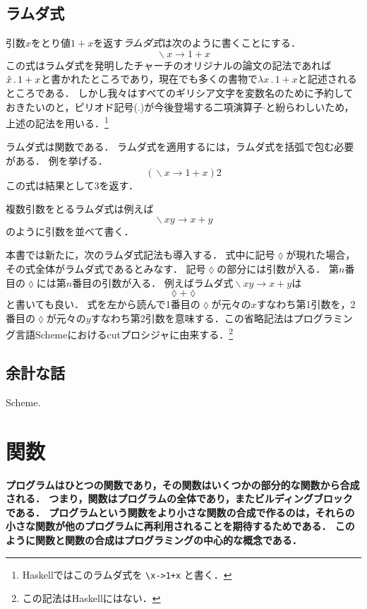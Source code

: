 \documentclass[twocolumn]{jsbook}
\DeclareMathOperator{\mathLambda}{\backslash}
\newcommand{\mathLambdaAnonymousParameter}{\lozenge}
\newcommand{\mathLambdaExpression}[2]{\mathLambda#1\rightarrow#2}
\newcommand{\keyword}[1]{\emph{#1}}
\newcommand{\code}[1]{\texttt{#1}}
\newenvironment{leader}{\begingroup\bf}{\endgroup}
\begin{document}
\section{ラムダ式}
引数$x$をとり値$1+x$を返す\keyword{ラムダ式}は次のように書くことにする．
$$\mathLambdaExpression{x}{1+x}$$
この式はラムダ式を発明したチャーチのオリジナルの論文の記法であれば$\Hat x\,.\,1+x$と書かれたところであり，現在でも多くの書物で$\lambda x\,.\,1+x$と記述されるところである．
しかし我々はすべてのギリシア文字を変数名のために予約しておきたいのと，ピリオド記号($.$)が今後登場する二項演算子$\cdot$と紛らわしいため，上述の記法を用いる．\footnote{Haskellではこのラムダ式を \code{\textbackslash x->1+x} と書く．}

ラムダ式は関数である．
ラムダ式を適用するには，ラムダ式を括弧で包む必要がある．
例を挙げる．
$$\left(\mathLambdaExpression{x}{1+x}\right)2$$
この式は結果として$3$を返す．

複数引数をとるラムダ式は例えば$$\mathLambdaExpression{xy}{x+y}$$のように引数を並べて書く．

本書では新たに，次のラムダ式記法も導入する．
式中に記号$\mathLambdaAnonymousParameter$が現れた場合，その式全体がラムダ式であるとみなす．
記号$\mathLambdaAnonymousParameter$の部分には引数が入る．
第$n$番目の$\mathLambdaAnonymousParameter$には第$n$番目の引数が入る．
例えばラムダ式$\mathLambdaExpression{xy}{x+y}$は$$\mathLambdaAnonymousParameter+\mathLambdaAnonymousParameter$$と書いても良い．
式を左から読んで1番目の$\mathLambdaAnonymousParameter$が元々の$x$すなわち第1引数を，2番目の$\mathLambdaAnonymousParameter$が元々の$y$すなわち第2引数を意味する．この省略記法はプログラミング言語Schemeにおけるcutプロシジャに由来する．\footnote{この記法はHaskellにはない．}

\section*{余計な話}

Scheme.

\chapter{関数}

\begin{leader}
プログラムはひとつの関数であり，その関数はいくつかの部分的な関数から合成される．
つまり，関数はプログラムの全体であり，またビルディングブロックである．
プログラムという関数をより小さな関数の合成で作るのは，それらの小さな関数が他のプログラムに再利用されることを期待するためである．
このように関数と関数の合成はプログラミングの中心的な概念である．
\end{leader}
\end{document}
